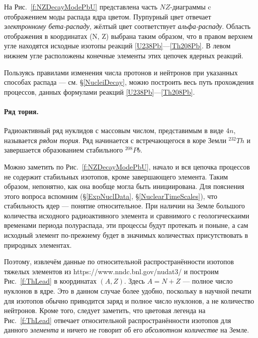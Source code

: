 \documentclass[a5paper,openany]{book}
\begin{document}
На Рис.~\ref{f:NZDecayModePbU} представлена часть $NZ$-диаграммы c отображением моды распада ядра цветом. Пурпурный цвет отвечает \emph{электронному бета-распаду}, 
жёлтый цвет соответствует \emph{альфа-распаду}. 
Область отображения в координатах (N, Z) выбрана таким образом, что в правом верхнем угле находятся исходные изотопы реакций \eqref{U238Pb}---\eqref{Th208Pb}.
В левом нижнем угле расположены конечные элементы этих цепочек ядерных реакций. 

Пользуясь правилами изменения числа протонов и нейтронов при указанных способах распада --- см. \S\ref{NucleiDecay}, можно построить весь путь прохождения процессов, данных формулами реакций \eqref{U238Pb}---\eqref{Th208Pb}.

\paragraph{Ряд тория.} \label{ThSeries}
Радиоактивный ряд нуклидов с массовым числом, представимым в виде $4n$, называется   \emph{рядом тория}. Ряд начинается с встречающегося в коре Земли $^{232}Th$ и завершается образованием стабильного $^{208}Pb$.

Можно заметить по Рис.~\ref{f:NZDecayModePbU}, начало и вся цепочка процессов не содержит стабильных изотопов, кроме завершающего элемента. Таким образом, непонятно, как она вообще могла быть инициирована.
Для пояснения этого вопроса вспомним (\S\ref{ExpNuclData}, \S\ref{NuclearTimeScales}), что стабильность ядер --- понятие относительное. При наличии на Земле большого количества исходного радиоактивного элемента и сравнимого с геологическаими временами периода полураспада, эти процессы будут протекать и поныне, а сам исходный элемент по-прежнему будет в значимых количествах присутствовать в природных элементах.

Поэтому, извлечём данные по относительной распространённости изотопов тяжелых элементов из https://www.nndc.bnl.gov/nudat3/ и построим Рис.~\ref{f:ThLead} в координатах $(A, Z)$. Здесь $A = N+Z$ --- полное число нуклонов в ядре. Это в данном случае более удобно, поскольку в научной печати для изотопов обычно приводится заряд и полное число нуклонов, а не количество нейтронов. Кроме того, следует заметить, что цветовая легенда на  Рис.~\ref{f:ThLead} отвечает относительной распространённости изотопов для данного \emph{элемента} и ничего не говорит об его \emph{абсолютном количестве} на Земле.
\end{document}
